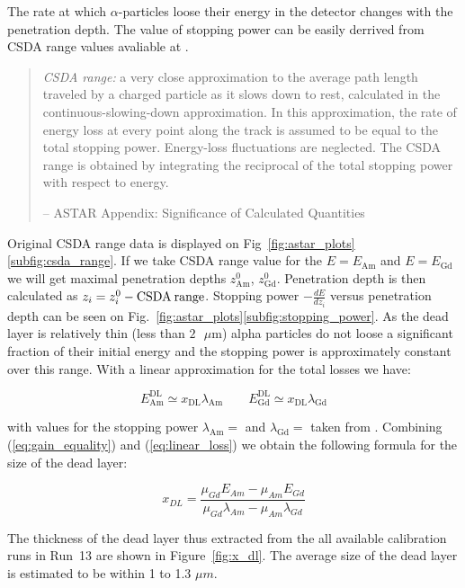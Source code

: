 \documentclass[a4paper,12pt]{article}
\begin{document}
The rate at which $\alpha$-particles loose their energy in the
detector changes with the penetration depth. The value of stopping power can
be easily derrived from CSDA range values avaliable at \cite{astar_database}.
\begin{quote}
\emph{CSDA range:} a very close approximation to the average path length
traveled by a charged particle as it slows down to rest, calculated in the
continuous-slowing-down approximation. In this approximation, the rate of
energy loss at every point along the track is assumed to be equal to the
total stopping power. Energy-loss fluctuations are neglected. The CSDA
range is obtained by integrating the reciprocal of the total stopping
power with respect to energy.

-- ASTAR Appendix: Significance of Calculated Quantities
\end{quote}
Original CSDA range data is displayed on Fig~\ref{fig:astar_plots}\ref{subfig:csda_range}.
If we take CSDA range value for the $E=E_{\text{Am}}$ and $E=E_{\text{Gd}}$
we will get maximal penetration depths $z^0_{\text{Am}}$, $z^0_{\text{Gd}}$.
Penetration depth is then calculated as $z_i = z^0_i - \text{CSDA\:range}$.
Stopping power $-\frac{dE}{dz_i}$ versus penetration depth can be seen
on Fig.~\ref{fig:astar_plots}\ref{subfig:stopping_power}.
As the dead layer is relatively thin (less than $2\text{ }\mu\text{m}$) alpha particles do not loose a
significant fraction of their initial energy and the stopping power
is approximately constant over this range. With a linear approximation for
the total losses we have:

\begin{equation}
E^\text{DL}_\text{Am} \simeq x_\text{DL} \lambda_\text{Am} \qquad
E^\text{DL}_\text{Gd} \simeq x_\text{DL} \lambda_\text{Gd}
\label{eq:linear_loss}
\end{equation}

\noindent
with values for the stopping power $\lambda_\text{Am} = $ and $\lambda_\text{Gd}
= $ taken from \cite{astar_database}. Combining (\ref{eq:gain_equality}) and
(\ref{eq:linear_loss}) we obtain the following formula for the size of the dead
layer:

\begin{equation}
x_{DL} = \frac{\mu_{Gd} E_{Am} - \mu_{Am} E_{Gd}}{\mu_{Gd}\lambda_{Am} - \mu_{Am}\lambda_{Gd}}
\label{eq:x_dl}
\end{equation}

The thickness of the dead layer thus extracted from the all available
calibration runs in Run~13 are shown in Figure~\ref{fig:x_dl}. The average size
of the dead layer is estimated to be within 1 to 1.3 $\mu m$.
\end{document}
